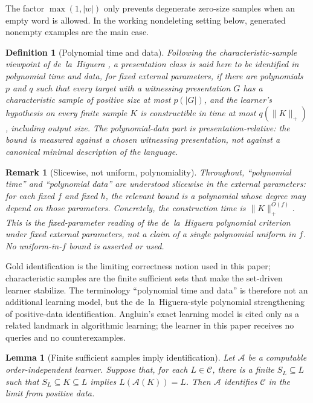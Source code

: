 \documentclass[11pt,a4paper]{article}
\newtheorem{lemma}[theorem]{Lemma}
\newtheorem{definition}[theorem]{Definition}
\newtheorem{remark}[theorem]{Remark}
\theoremstyle{remark}
\begin{document}
The factor \(\max(1,|w|)\) only prevents degenerate zero-size samples when an
empty word is allowed.  In the working nondeleting setting below, generated
nonempty examples are the main case.

\begin{definition}[Polynomial time and data]
\label{def:poly-time-data}
Following the characteristic-sample viewpoint of de~la~Higuera
\cite{delaHiguera1997,delaHiguera2010}, a presentation class is said here to be
identified in polynomial time and data, for fixed external parameters, if there
are polynomials \(p\) and \(q\) such that every target with a witnessing
presentation \(G\) has a characteristic sample of positive size at most
\(p(|G|)\), and the learner's hypothesis on every finite sample \(K\) is
constructible in time at most \(q(\|K\|_+)\), including output size.  The
polynomial-data part is presentation-relative: the bound is measured against a
chosen witnessing presentation, not against a canonical minimal description of
the language.
\end{definition}

\begin{remark}[Slicewise, not uniform, polynomiality]
\label{rem:slicewise-poly}
Throughout, ``polynomial time'' and ``polynomial data'' are understood
slicewise in the external parameters: for each fixed \(f\) and fixed \(h\), the relevant bound is a polynomial
whose degree may depend on those parameters.  Concretely, the construction time
is \(\|K\|_+^{O(f)}\).  This is the fixed-parameter reading of the
de~la~Higuera polynomial criterion under fixed external parameters, not a claim
of a single polynomial uniform in \(f\).  No uniform-in-\(f\) bound is asserted or
used.
\end{remark}

Gold identification \cite{Gold1967} is the limiting correctness notion used in
this paper; characteristic samples are the finite sufficient sets that make the
set-driven learner stabilize.  The terminology ``polynomial time and data'' is
therefore not an additional learning model, but the de~la~Higuera-style
polynomial strengthening of positive-data identification.  Angluin's exact
learning model \cite{Angluin1987} is cited only as a related landmark in
algorithmic learning; the learner in this paper receives no queries and no
counterexamples.

\begin{lemma}[Finite sufficient samples imply identification]
\label{lem:sufficient-to-gold}
Let \(\mathcal A\) be a computable order-independent learner.  Suppose that,
for each \(L\in\mathcal C\), there is a finite \(S_L\subseteq L\) such that
\(S_L\subseteq K\subseteq L\) implies \(L(\mathcal A(K))=L\).  Then
\(\mathcal A\) identifies \(\mathcal C\) in the limit from positive data.
\end{lemma}
\end{document}
